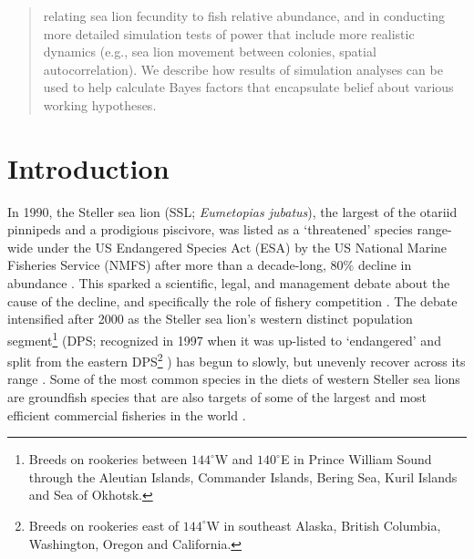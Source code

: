 \documentclass[nonumbib,leqno]{nrc1}
\begin{document}
\begin{abstract}
relating sea lion fecundity to fish relative abundance, and in conducting more detailed simulation tests of power that include more realistic dynamics (e.g., sea lion movement between colonies, spatial autocorrelation).  We describe how results of simulation analyses can be used to help calculate Bayes factors that encapsulate belief about various working hypotheses.
\end{abstract}




\clearpage

\renewcommand{\baselinestretch}{1.8}\normalsize


\section{Introduction}

In 1990, the Steller sea lion (SSL; {\it Eumetopias jubatus}), the largest of the otariid pinnipeds and a prodigious piscivore, was listed as a `threatened' species range-wide under the US Endangered Species Act (ESA) by the US National Marine Fisheries Service (NMFS) after more than a decade-long, 80\% decline in abundance \citep{CalkinsPitcher1982,LoughlinEtAl1992,NMFS1992}.  This sparked a scientific, legal, and management debate about the cause of the decline, and specifically the role of fishery competition \citep{Alverson1992,NMFS1992,FritzEtAl1995,RosenTrites2000,McBeath2004}.  The debate intensified after 2000 as the Steller sea lion's western distinct population segment\footnote[1]{Breeds on rookeries between $144^\circ$W and $140^\circ$E in Prince William Sound through the Aleutian Islands, Commander Islands, Bering Sea, Kuril Islands and Sea of Okhotsk.}  (DPS; recognized in 1997 when it was up-listed to  `endangered' and split from the eastern DPS\footnote[2]{Breeds on rookeries east of $144^\circ$W in southeast Alaska, British Columbia, Washington, Oregon and California.} ) has begun to slowly, but unevenly recover across its range \citep{Loughlin1997,JohnsonFritzInReview, NMFS2013}.  Some of the most common species in the diets of western Steller sea lions are groundfish species \citep[e.g., walleye pollock {\it Theragra chalcogramma}, Pacific cod {\it Gadus macrocephalus}, and Atka mackerel {\it Pleurogrammus monopterygius};][]{ SinclairZeppelin2002,TollitEtAl2004,ZeppelinEtAl2004,McKenzieWynne2008,WaiteEtAl2012} that are also targets of some of the largest and most efficient commercial fisheries in the world \citep{FissellEtAl2013}.
\end{document}
